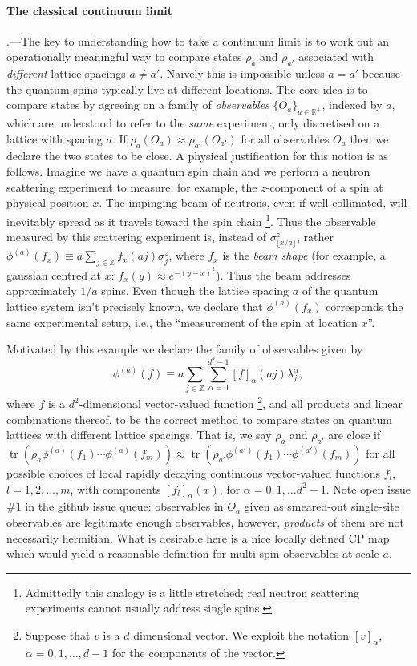 \documentclass[prl,twocolumn,lengthcheck,superscriptaddress]{revtex4-1}
\newcommand{\tr}{\operatorname{tr}}
\theoremstyle{definition}
\theoremstyle{remark}
\begin{document}
\paragraph{The classical continuum limit}\hspace{-1em}.---The key to understanding how to take a continuum limit is to work out an operationally meaningful way to compare states $\rho_a$ and $\rho_{a'}$ associated with \emph{different} lattice spacings $a\not=a'$. Naively this is impossible unless $a=a'$ because the quantum spins typically live at different locations. The core idea is to compare states by agreeing on a family of \emph{observables} $\{O_a\}_{a\in\mathbb{R}^+}$, indexed by $a$, which are understood to refer to the \emph{same} experiment, only discretised on a lattice with spacing $a$. If $\rho_a(O_a) \approx \rho_{a'}(O_{a'})$ for all observables $O_a$ then we declare the two states to be close. A physical justification for this notion is as follows. Imagine we have a quantum spin chain and we perform a neutron scattering experiment to measure, for example, the $z$-component of a spin at physical position $x$. The impinging beam of neutrons, even if well collimated, will inevitably spread as it travels toward the spin chain \footnote{Admittedly this analogy is a little stretched; real neutron scattering experiments cannot usually address single spins.}. Thus the observable measured by this scattering experiment is, instead of $\sigma^z_{\lfloor x/a \rfloor}$, rather $\phi^{(a)}(f_x) \equiv a\sum_{j\in\mathbb{Z}} f_x(aj) \sigma_j^z$, where $f_x$ is the \emph{beam shape} (for example, a gaussian centred at $x$: $f_x(y) \approx e^{-(y-x)^2}$). Thus the beam addresses approximately $1/a$ spins. Even though the lattice spacing $a$ of the quantum lattice system isn't precisely known, we declare that $\phi^{(a)}(f_x)$ corresponds the same experimental setup, i.e., the ``measurement of the spin at location $x$''. 

Motivated by this example we declare the family of observables given by
\begin{equation}
	\phi^{(a)}(f) \equiv a\sum_{j\in\mathbb{Z}} \sum_{\alpha=0}^{d^2-1} [f]_\alpha(aj) \lambda_j^\alpha,
\end{equation}
where $f$ is a $d^2$-dimensional vector-valued function \footnote{Suppose that $v$ is a $d$ dimensional vector. We exploit the notation $[v]_\alpha$, $\alpha=0,1,\ldots, d-1$ for the components of the vector.}, and all products and linear combinations thereof, to be the correct method to compare states on quantum lattices with different lattice spacings. That is, we say $\rho_a$ and $\rho_{a'}$ are close if $\tr(\rho_a \phi^{(a)}(f_1)\cdots \phi^{(a)}(f_m)) \approx \tr(\rho_{a'} \phi^{(a')}(f_1)\cdots \phi^{(a')}(f_m))$ for all possible choices of local rapidly decaying continuous vector-valued functions $f_l$, $l= 1, 2, \ldots, m$, with components $[f_l]_{\alpha}(x)$, for $\alpha = 0, 1, \ldots d^2-1$. {\color{red} Note open issue \#1 in the github issue queue: observables in $O_a$ given as smeared-out single-site observables are legitimate enough observables, however, \emph{products} of them are not necessarily hermitian. What is desirable here is a nice locally defined CP map which would yield a reasonable definition for multi-spin observables at scale $a$.}
\end{document}
